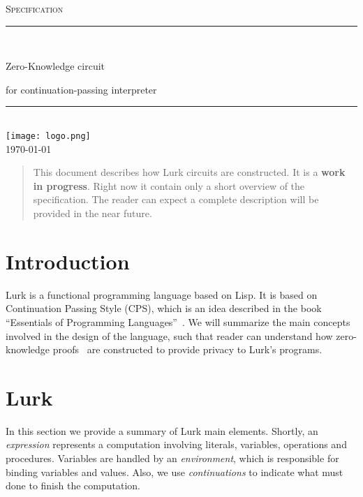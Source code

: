 \documentclass[10pt, english]{article}
\begin{document}
\begin{titlepage}
	\newcommand{\HRule}{\rule{\linewidth}{0.5mm}}

	\clearpage\thispagestyle{empty}
	\centering
	\vspace{1cm}

	\textsc{\Large Specification}\\[.5cm]
	\HRule\\[.5cm]
	{\Huge Zero-Knowledge circuit \par}
	\vspace{.5cm}
	{\Large for continuation-passing interpreter \par}
	\vspace{.5cm}
	\HRule \\[.5cm]


\texttt{[image: logo.png]}\\[.1cm]
	{\large \today}\\[2cm]
\vfill
\end{titlepage}


\begin{abstract}
  This document describes how Lurk circuits are constructed. It is a \textbf{work in progress}.
  Right now it contain only a short overview of the specification. The reader can expect a complete description will be provided in the near future.
\end{abstract}

\tableofcontents

\newpage

\section{Introduction}

Lurk is a functional programming language based on Lisp. It is based on Continuation Passing Style (CPS), which is an idea described in the book ``Essentials of Programming Languages''~\cite{FWbook}. We will summarize the main concepts involved in the design of the language, such that reader can understand how zero-knowledge proofs~\cite{groth16, nova, halo2} are constructed to provide privacy to Lurk's programs.

\section{Lurk}

In this section we provide a summary of Lurk main elements. Shortly, an \textit{expression} represents a computation involving literals, variables, operations and procedures. Variables are handled by an \textit{environment}, which is responsible for binding variables and values. Also, we use \textit{continuations} to indicate what must done to finish the computation.
\end{document}
